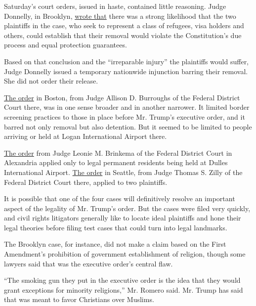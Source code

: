 Saturday's court orders, issued in haste, contained little reasoning.
Judge Donnelly, in Brooklyn,
\href{https://www.nytimes3xbfgragh.onion/interactive/2017/01/28/us/politics/trump-darweesh-decision-stay-refugee-ban.html}{wrote
that} there was a strong likelihood that the two plaintiffs in the case,
who seek to represent a class of refugees, visa holders and others,
could establish that their removal would violate the Constitution's due
process and equal protection guarantees.

Based on that conclusion and the ``irreparable injury'' the plaintiffs
would suffer, Judge Donnelly issued a temporary nationwide injunction
barring their removal. She did not order their release.

\href{https://aclum.org/wp-content/uploads/2017/01/6-TRO-Jan-29-2017.pdf}{The
order} in Boston, from Judge Allison D. Burroughs of the Federal
District Court there, was in one sense broader and in another narrower.
It limited border screening practices to those in place before Mr.
Trump's executive order, and it barred not only removal but also
detention. But it seemed to be limited to people arriving or held at
Logan International Airport there.

\href{https://www.justice4all.org/wp-content/uploads/2017/01/TRO-order-signed.pdf}{The
order} from Judge Leonie M. Brinkema of the Federal District Court in
Alexandria applied only to legal permanent residents being held at
Dulles International Airport.
\href{https://crosscut.com/wp-content/uploads/2017/01/Judge-Zilly_Order.pdf}{The
order} in Seattle, from Judge Thomas S. Zilly of the Federal District
Court there, applied to two plaintiffs.

It is possible that one of the four cases will definitively resolve an
important aspect of the legality of Mr. Trump's order. But the cases
were filed very quickly, and civil rights litigators generally like to
locate ideal plaintiffs and hone their legal theories before filing test
cases that could turn into legal landmarks.

The Brooklyn case, for instance, did not make a claim based on the First
Amendment's prohibition of government establishment of religion, though
some lawyers said that was the executive order's central flaw.

``The smoking gun they put in the executive order is the idea that they
would grant exceptions for minority religions,'' Mr. Romero said. Mr.
Trump has said that was meant to favor Christians over Muslims.

